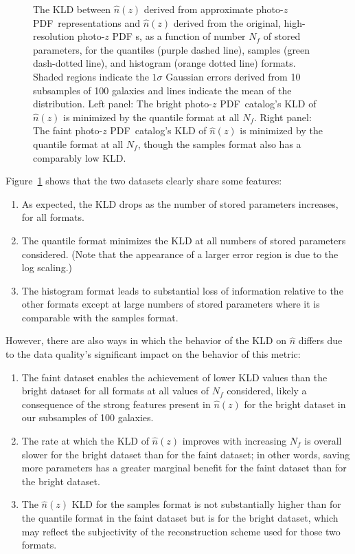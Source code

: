 \documentclass[\docopts]{\docclass}
\newcommand{\pz}{photo-$z$ PDF}
\newcommand{\mgdata}{bright\xspace}
\newcommand{\ssdata}{faint\xspace}
\begin{document}
\begin{figure}
\begin{center}
    \caption{The KLD between $\hat{n}(z)$ derived from approximate \pz\ 
representations and $\hat{n}(z)$ derived from the original, high-resolution \pz 
s, as a function of number $N_{f}$ of stored parameters, for the quantiles 
(purple dashed line), samples (green dash-dotted line), and histogram (orange 
dotted line) formats.
    Shaded regions indicate the $1\sigma$ Gaussian errors derived from 10 
subsamples of 100 galaxies and lines indicate the mean of the distribution.
    Left panel: The \mgdata \pz\ catalog's KLD of $\hat{n}(z)$ is minimized by 
the quantile format at all $N_{f}$.
    Right panel: The \ssdata \pz\ catalog's KLD of $\hat{n}(z)$ is minimized by 
the quantile format at all $N_{f}$, though the samples format also has a 
comparably low KLD.
    \label{fig:kld}}
  \end{center}
\end{figure}
Figure~\ref{fig:kld} shows that the two datasets clearly share some features:
\begin{enumerate}
\item As expected, the KLD drops as the number of stored parameters increases, 
for all formats.
\item The quantile format minimizes the KLD at all numbers of stored parameters 
considered.  (Note that the appearance of a larger error region is due to the 
log scaling.)
\item The histogram format leads to substantial loss of information relative to 
the other formats except at large numbers of stored parameters where it is 
comparable with the samples format.
\end{enumerate}
However, there are also ways in which the behavior of the KLD on $\hat{n}$ 
differs due to the data quality's significant impact on the behavior of this 
metric:
\begin{enumerate}
\item The \ssdata dataset enables the achievement of lower KLD values than the 
\mgdata dataset for all formats at all values of $N_{f}$ considered, likely a 
consequence of the strong features present in $\hat{n}(z)$ for the \mgdata 
dataset in our subsamples of 100 galaxies.
\item The rate at which the KLD of $\hat{n}(z)$ improves with increasing $N_{f} 
$ is overall slower for the \mgdata dataset than for the \ssdata dataset; in 
other words, saving more parameters has a greater marginal benefit for the 
\ssdata dataset than for the \mgdata dataset.
\item The $\hat{n}(z)$ KLD for the samples format is not substantially higher 
than for the quantile format in the \ssdata dataset but is for the \mgdata 
dataset, which may reflect the subjectivity of the reconstruction scheme used 
for those two formats.
\end{enumerate}
\end{document}
